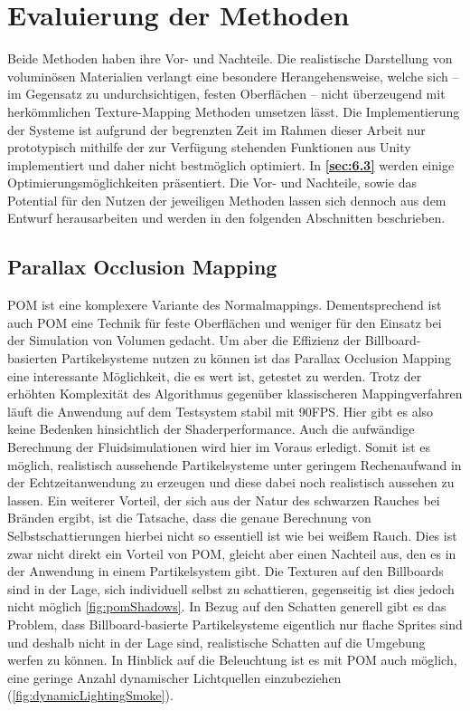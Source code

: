 \section{Evaluierung der Methoden}
\label{sec:5}

Beide Methoden haben ihre Vor- und Nachteile. Die realistische Darstellung von voluminösen Materialien verlangt
eine besondere Herangehensweise, welche sich – im Gegensatz zu undurchsichtigen, festen Oberflächen –
nicht überzeugend mit herkömmlichen Texture-Mapping Methoden umsetzen lässt.
Die Implementierung der Systeme ist aufgrund der begrenzten Zeit im Rahmen dieser Arbeit nur prototypisch mithilfe der
zur Verfügung stehenden Funktionen aus Unity implementiert und daher nicht bestmöglich optimiert.
In \textbf{\autoref{sec:6.3}} werden einige Optimierungsmöglichkeiten präsentiert.
Die Vor- und Nachteile, sowie das Potential für den Nutzen der jeweiligen Methoden lassen sich dennoch aus dem Entwurf
herausarbeiten und werden in den folgenden Abschnitten beschrieben.


\subsection{Parallax Occlusion Mapping}
\label{sec:5.1}


POM ist eine komplexere Variante des Normalmappings. Dementsprechend ist auch POM eine Technik für feste Oberflächen und weniger
für den Einsatz bei der Simulation von Volumen gedacht. Um aber die Effizienz der Billboard-basierten Partikelsysteme
nutzen zu können ist das Parallax Occlusion Mapping eine interessante Möglichkeit, die es wert ist, getestet zu werden.
Trotz der erhöhten Komplexität des Algorithmus gegenüber klassischeren Mappingverfahren läuft die Anwendung auf dem Testsystem
stabil mit 90FPS. Hier gibt es also keine Bedenken hinsichtlich der Shaderperformance. Auch die aufwändige Berechnung der
Fluidsimulationen wird hier im Voraus erledigt. Somit ist es möglich, realistisch aussehende Partikelsysteme unter geringem
Rechenaufwand in der Echtzeitanwendung zu erzeugen und diese dabei noch realistisch aussehen zu lassen.
Ein weiterer Vorteil, der sich aus der Natur des schwarzen Rauches bei Bränden ergibt, ist die Tatsache, dass die genaue Berechnung
von Selbstschattierungen hierbei nicht so essentiell ist wie bei weißem Rauch.
Dies ist zwar nicht direkt ein Vorteil von POM, gleicht aber einen Nachteil aus, den es in der Anwendung in einem Partikelsystem gibt.
Die Texturen auf den Billboards sind in der Lage, sich individuell selbst zu schattieren, gegenseitig ist dies jedoch nicht möglich \autoref{fig:pomShadows}. 
In Bezug auf den Schatten generell gibt es das Problem, dass Billboard-basierte Partikelsysteme eigentlich nur flache Sprites sind und deshalb nicht in der 
Lage sind, realistische Schatten auf die Umgebung werfen zu können. In Hinblick auf die Beleuchtung ist es mit POM auch möglich, eine geringe Anzahl dynamischer 
Lichtquellen einzubeziehen (\autoref{fig:dynamicLightingSmoke}).

